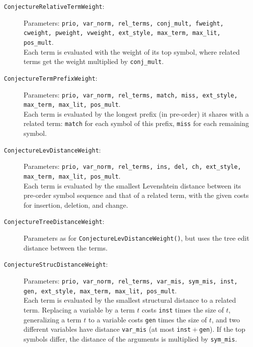 \documentclass{report}
\begin{document}
\begin{description}
\item[\texttt{ConjectureRelativeTermWeight}:] Parameters:
    \texttt{prio, var\_norm, rel\_terms, conj\_mult, fweight, cweight,
    pweight, vweight, ext\_style, max\_term, max\_lit, pos\_mult}.\\
  Each term is evaluated with the
  weight of its top symbol, where related terms get the weight
  multiplied by \texttt{conj\_mult}.
\item[\texttt{ConjectureTermPrefixWeight}:] Parameters: \texttt{prio,
    var\_norm, rel\_terms, match, miss, ext\_style, max\_term,
    max\_lit, pos\_mult}.\\
  Each
  term is evaluated by the longest prefix (in pre-order) it shares
  with a related term: \texttt{match} for each symbol of this prefix,
  \texttt{miss} for each remaining symbol.
\item[\texttt{ConjectureLevDistanceWeight}:] Parameters: \texttt{prio,
    var\_norm, rel\_terms, ins, del, ch, ext\_style, max\_term,
    max\_lit, pos\_mult}.\\
  Each
  term is evaluated by the smallest Levenshtein distance between its
  pre-order symbol sequence and that of a related term, with the
  given costs for insertion, deletion, and change.
\item[\texttt{ConjectureTreeDistanceWeight}:] Parameters as for
  \texttt{ConjectureLevDistanceWeight()}, but uses the tree edit
  distance between the terms.
\item[\texttt{ConjectureStrucDistanceWeight}:] Parameters:
    \texttt{prio, var\_norm, rel\_terms, var\_mis, sym\_mis, inst,
    gen, ext\_style, max\_term, max\_lit, pos\_mult}.\\
  Each term is evaluated by the smallest
  structural distance to a related term. Replacing a variable by a
  term $t$ costs \texttt{inst} times the size of $t$, generalizing a
  term $t$ to a variable costs \texttt{gen} times the size of $t$,
  and two different variables have distance \texttt{var\_mis} (at
  most \texttt{inst}${}+{}$\texttt{gen}). If the top symbols differ,
  the distance of the arguments is multiplied by \texttt{sym\_mis}.

\end{description}
\end{document}
